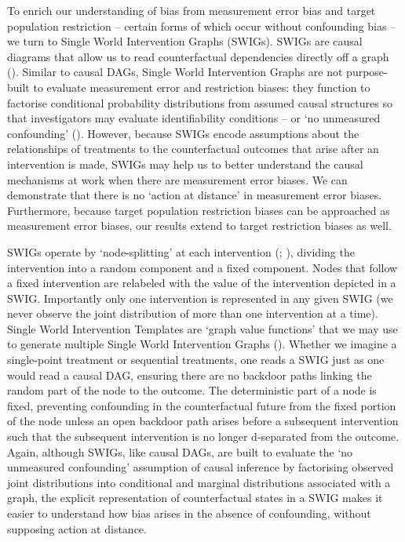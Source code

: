 \documentclass[
  single column]{article}
\begin{document}
To enrich our understanding of bias from measurement error bias and
target population restriction -- certain forms of which occur without
confounding bias -- we turn to Single World Intervention Graphs (SWIGs).
SWIGs are causal diagrams that allow us to read counterfactual
dependencies directly off a graph
(). Similar to
causal DAGs, Single World Intervention Graphs are not purpose-built to
evaluate measurement error and restriction biases: they function to
factorise conditional probability distributions from assumed causal
structures so that investigators may evaluate identifiability conditions
-- or `no unmeasured confounding'
(). However,
because SWIGs encode assumptions about the relationships of treatments
to the counterfactual outcomes that arise after an intervention is made,
SWIGs may help us to better understand the causal mechanisms at work
when there are measurement error biases. We can demonstrate that there
is no `action at distance' in measurement error biases. Furthermore,
because target population restriction biases can be approached as
measurement error biases, our results extend to target restriction
biases as well.

SWIGs operate by `node-splitting' at each intervention
(;
), dividing
the intervention into a random component and a fixed component. Nodes
that follow a fixed intervention are relabeled with the value of the
intervention depicted in a SWIG. Importantly only one intervention is
represented in any given SWIG (we never observe the joint distribution
of more than one intervention at a time). Single World Intervention
Templates are `graph value functions' that we may use to generate
multiple Single World Intervention Graphs
().
Whether we imagine a single-point treatment or sequential treatments,
one reads a SWIG just as one would read a causal DAG, ensuring there are
no backdoor paths linking the random part of the node to the outcome.
The deterministic part of a node is fixed, preventing confounding in the
counterfactual future from the fixed portion of the node unless an open
backdoor path arises before a subsequent intervention such that the
subsequent intervention is no longer d-separated from the outcome.
Again, although SWIGs, like causal DAGs, are built to evaluate the `no
unmeasured confounding' assumption of causal inference by factorising
observed joint distributions into conditional and marginal distributions
associated with a graph, the explicit representation of counterfactual
states in a SWIG makes it easier to understand how bias arises in the
absence of confounding, without supposing action at distance.
\end{document}

